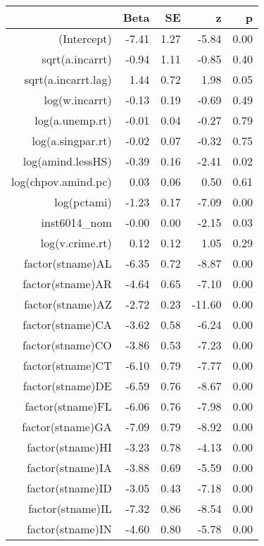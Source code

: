 \begin{table}[ht]
\centering
\begin{tabular}{rrrrr}
  \hline
 & Beta & SE & z & p \\ 
  \hline
(Intercept) & -7.41 & 1.27 & -5.84 & 0.00 \\ 
  sqrt(a.incarrt) & -0.94 & 1.11 & -0.85 & 0.40 \\ 
  sqrt(a.incarrt.lag) & 1.44 & 0.72 & 1.98 & 0.05 \\ 
  log(w.incarrt) & -0.13 & 0.19 & -0.69 & 0.49 \\ 
  log(a.unemp.rt) & -0.01 & 0.04 & -0.27 & 0.79 \\ 
  log(a.singpar.rt) & -0.02 & 0.07 & -0.32 & 0.75 \\ 
  log(amind.lessHS) & -0.39 & 0.16 & -2.41 & 0.02 \\ 
  log(chpov.amind.pc) & 0.03 & 0.06 & 0.50 & 0.61 \\ 
  log(pctami) & -1.23 & 0.17 & -7.09 & 0.00 \\ 
  inst6014\_nom & -0.00 & 0.00 & -2.15 & 0.03 \\ 
  log(v.crime.rt) & 0.12 & 0.12 & 1.05 & 0.29 \\ 
  factor(stname)AL & -6.35 & 0.72 & -8.87 & 0.00 \\ 
  factor(stname)AR & -4.64 & 0.65 & -7.10 & 0.00 \\ 
  factor(stname)AZ & -2.72 & 0.23 & -11.60 & 0.00 \\ 
  factor(stname)CA & -3.62 & 0.58 & -6.24 & 0.00 \\ 
  factor(stname)CO & -3.86 & 0.53 & -7.23 & 0.00 \\ 
  factor(stname)CT & -6.10 & 0.79 & -7.77 & 0.00 \\ 
  factor(stname)DE & -6.59 & 0.76 & -8.67 & 0.00 \\ 
  factor(stname)FL & -6.06 & 0.76 & -7.98 & 0.00 \\ 
  factor(stname)GA & -7.09 & 0.79 & -8.92 & 0.00 \\ 
  factor(stname)HI & -3.23 & 0.78 & -4.13 & 0.00 \\ 
  factor(stname)IA & -3.88 & 0.69 & -5.59 & 0.00 \\ 
  factor(stname)ID & -3.05 & 0.43 & -7.18 & 0.00 \\ 
  factor(stname)IL & -7.32 & 0.86 & -8.54 & 0.00 \\ 
  factor(stname)IN & -4.60 & 0.80 & -5.78 & 0.00 \\ 

\end{tabular}
\end{table}
